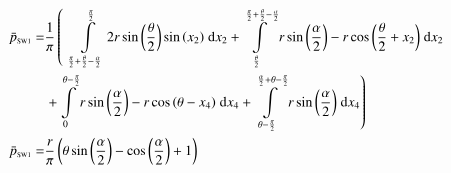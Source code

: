 \begin{align}
    \bar{p}_{\text{\tiny{SW1}}} =&\frac{1}{\pi} \left(\;\;\int\limits_{\frac{\pi}{2} + \frac{\theta}{2} - \frac{\alpha}{2}}^{\frac{\pi}{2}}2 r \sin{\left (\frac{\theta}{2} \right )} \sin{\left (x_{2} \right )}\;\mathrm{d}x_{2}+\int\limits_{\frac{\theta}{2}}^{\frac{\pi}{2} + \frac{\theta}{2} - \frac{\alpha}{2}}r \sin{\left (\frac{\alpha}{2} \right )} - r \cos{\left (\frac{\theta}{2} + x_{2} \right )}\;\mathrm{d}x_{2}\right.\notag\\
 &\left.+\int\limits_{0}^{\theta - \frac{\pi}{2}}r \sin{\left (\frac{\alpha}{2} \right )} - r \cos{\left (\theta - x_{4} \right )}\;\mathrm{d}x_{4}+\int\limits_{\theta - \frac{\pi}{2}}^{\frac{\alpha}{2} + \theta - \frac{\pi}{2}}r \sin{\left (\frac{\alpha}{2} \right )}\;\mathrm{d}x_{4}\right)\label{pSW1Def}\\
    \bar{p}_{\text{\tiny{SW1}}}  =& \frac{r}{\pi} \left(\theta \sin{\left (\frac{\alpha}{2} \right )} - \cos{\left (\frac{\alpha}{2} \right )} + 1\right)\label{pSW1Sln}
\end{align}